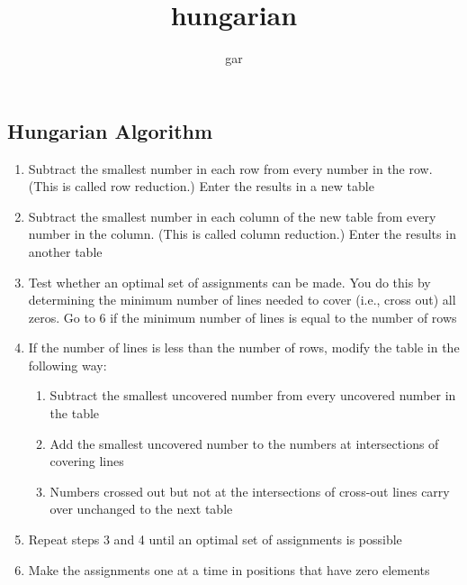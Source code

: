 \documentclass[12pt]{article}
\title{hungarian}
\author{gar}
\date{}
\begin{document}
\subsection*{Hungarian Algorithm}
\label{sec-1-1}

\begin{enumerate}
\item Subtract the smallest number in each row from every number in the row. (This is called row reduction.) Enter the results in a new table
\item Subtract the smallest number in each column of the new table from every number in the column. (This is called column reduction.) Enter the results in another table
\item Test whether an optimal set of assignments can be made. You do this by determining the minimum number of lines needed to cover (i.e., cross out) all zeros. Go to 6 if the minimum number of lines is equal to the number of rows
\item If the number of lines is less than the number of rows, modify the table in the following way:
\begin{enumerate}
\item Subtract the smallest uncovered number from every uncovered number in the table
\item Add the smallest uncovered number to the numbers at intersections of covering lines
\item Numbers crossed out but not at the intersections of cross-out lines carry over unchanged to the next table
\end{enumerate}
\item Repeat steps 3 and 4 until an optimal set of assignments is possible
\item Make the assignments one at a time in positions that have zero elements
\end{enumerate}
\end{document}
